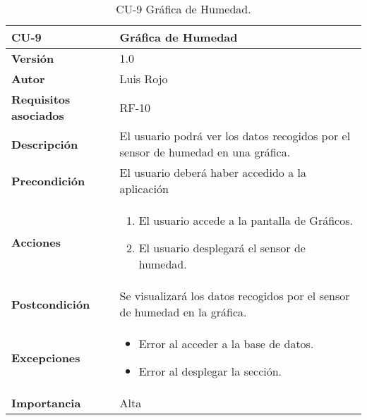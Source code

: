 \begin{table}[p]
	\centering
	\begin{tabularx}{\linewidth}{ p{} p{} }
		\toprule
		\textbf{CU-9}    & \textbf{Gráfica de Humedad}\\
		\toprule
		\textbf{Versión}              & 1.0    \\
		\textbf{Autor}                & Luis Rojo \\
		\textbf{Requisitos asociados} & RF-10 \\
		\textbf{Descripción}          & El usuario podrá ver los datos recogidos por el sensor de humedad en una gráfica. \\
		\textbf{Precondición}         &  El usuario deberá haber accedido a la aplicación \\
		\textbf{Acciones}             &
		\begin{enumerate}
			\def\labelenumi{\arabic{enumi}.}
			\tightlist
			\item El usuario accede a la pantalla de Gráficos.
                \item El usuario desplegará el sensor de humedad.
		\end{enumerate}\\
		\textbf{Postcondición}        & Se visualizará los datos recogidos por el sensor de humedad en la gráfica. \\
		\textbf{Excepciones}          &  
            \begin{itemize}
                \item Error al acceder a la base de datos.
                \item Error al desplegar la sección.
            \end{itemize}
           \\
		\textbf{Importancia}          & Alta  \\
		\bottomrule
	\end{tabularx}
	\caption{CU-9 Gráfica de Humedad.}
\end{table}

